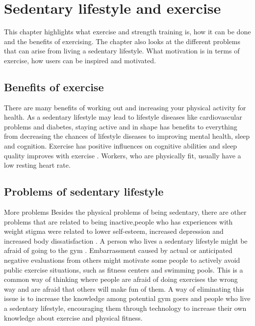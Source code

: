 \chapter{Sedentary lifestyle and exercise}
This chapter highlights what exercise and strength training is, how it can be done and the benefits of exercising. The chapter also looks at the different problems that can arise from living a sedentary lifestyle. What motivation is in terms of exercise, how users can be inspired and motivated.

\section{Benefits of exercise}
There are many benefits of working out and increasing your physical activity for health. As a sedentary lifestyle may lead to lifestyle diseases like cardiovascular problems and diabetes, staying active and in shape has benefits to everything from decreasing the chances of lifestyle diseases to improving mental health, sleep and cognition. Exercise has positive influences on cognitive abilities and sleep quality improves with exercise \cite{Lurati}. Workers, who are physically fit, usually have a low resting heart rate.

\section{Problems of sedentary lifestyle}
More problems
Besides the physical problems of being sedentary, there are other problems that are related to being inactive,people who has experiences with weight stigma were related to lower self-esteem, increased depression and increased body dissatisfaction \cite{Friedman}.
A person who lives a sedentary lifestyle might be afraid of going to the gym \cite{Vartanian2008}. Embarrassment caused by actual or anticipated negative evaluations from others might motivate some people to actively avoid public exercise situations, such as fitness centers and swimming pools. This is a common way of thinking where people are afraid of doing exercises the wrong way and are afraid that others will make fun of them. A way of eliminating this issue is to increase the knowledge among potential gym goers and people who live a sedentary lifestyle, encouraging them through technology to increase their own knowledge about exercise and physical fitness.

